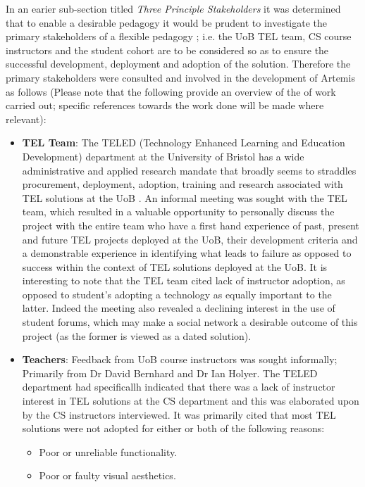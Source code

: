 In an earier sub-section titled  \textit{Three Principle Stakeholders} it was determined that to enable a desirable pedagogy it would be prudent to investigate the primary stakeholders of a flexible pedagogy \cite{Gordon2014}; i.e. the UoB TEL team, CS course instructors and the student cohort are to be considered so as to ensure the successful development, deployment and adoption of the solution. Therefore the primary stakeholders were consulted and involved in the development of Artemis as follows (Please note that the following provide an overview of the of work carried out; specific references towards the work done will be made where relevant):
\begin{itemize}
    \item \textbf{TEL Team}: The TELED (Technology Enhanced Learning and Education Development)  department at the University of Bristol has a wide administrative and applied research mandate that broadly seems to straddles procurement, deployment, adoption, training and research associated with TEL solutions at the UoB \cite{UniversityofBristol}. An informal meeting was sought with the TEL team, which resulted in a valuable opportunity to personally discuss the project with the entire team who have a first hand experience of past, present and future TEL projects deployed at the UoB, their development criteria and a demonstrable experience in identifying what leads to failure as opposed to success within the context of TEL solutions deployed at the UoB. It is interesting to note that the TEL team cited lack of instructor adoption, as opposed to student's adopting a technology as equally important to the latter. Indeed the meeting also revealed a declining interest in the use of student forums, which may make a social network a desirable outcome of this project (as the former is viewed as a dated solution).
    
    \item \textbf{Teachers}: Feedback from UoB course instructors was sought informally; Primarily from Dr David Bernhard and Dr Ian Holyer. The TELED department had specificallh indicated that there was a lack of instructor interest in TEL solutions at the CS department and this was elaborated upon by the CS instructors interviewed. It was primarily cited that most TEL solutions were not adopted for either or both of the following reasons:
    \begin{itemize}
        \item Poor or unreliable functionality.
        \item Poor or faulty visual aesthetics.
    \end{itemize}
    

\end{itemize}
